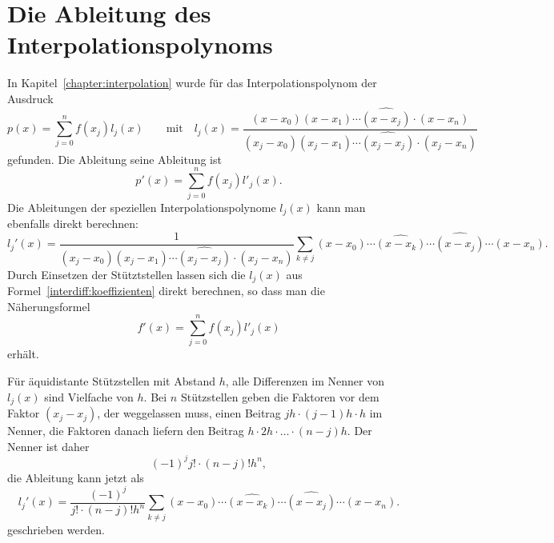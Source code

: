 \section{Die Ableitung des Interpolationspolynoms}
In Kapitel~\ref{chapter:interpolation} wurde für das Interpolationspolynom
der Ausdruck
\[
p(x)
=
\sum_{j=0}^n f(x_j) l_j(x)
\qquad\text{mit}\quad
l_j(x)
=
\frac{(x-x_0)(x-x_1)\cdots\widehat{(x-x_j)}\cdot (x-x_n)}{(x_j-x_0)(x_j-x_1)\cdots\widehat{(x_j-x_j)}\cdot (x_j-x_n)}
\]
gefunden.
Die Ableitung seine Ableitung ist
\[
p'(x)
=
\sum_{j=0}^n f(x_j) l'_j(x).
\]
Die Ableitungen der speziellen Interpolationspolynome $l_j(x)$ kann
man ebenfalls direkt berechnen:
\begin{equation}
l_j'(x)
=
\frac{1}{(x_j-x_0)(x_j-x_1)\cdots\widehat{(x_j-x_j)}\cdot (x_j-x_n)}
\sum_{k\ne j} (x-x_0)\cdots \widehat{(x-x_k)}\cdots\widehat{(x-x_j)}\cdots (x-x_n).
\label{interdiff:koeffizienten}
\end{equation}
Durch Einsetzen der Stütztstellen lassen sich die $l_j(x)$ aus
Formel~\eqref{interdiff:koeffizienten} direkt berechnen, so dass
man die Näherungsformel 
\begin{equation}
f'(x) = \sum_{j=0}^n f(x_j) l'_j(x)
\label{interdiff:ableitung}
\end{equation}
erhält.

Für äquidistante Stützstellen mit Abstand $h$, alle Differenzen im
Nenner von $l_j(x)$ sind Vielfache von $h$.
Bei $n$ Stützstellen geben die Faktoren vor dem Faktor $(x_j-x_j)$, der
weggelassen muss, einen Beitrag $jh\cdot (j-1)h \cdot h$ im Nenner,
die Faktoren danach liefern den Beitrag $h\cdot 2h\cdot \dots\cdot (n-j)h$.
Der Nenner ist daher
\[
(-1)^j
j!\cdot (n-j)! h^n,
\]
die Ableitung kann jetzt als
\begin{equation}
l_j'(x)
=
\frac{(-1)^j}{j!\cdot (n-j)! h^n}
\sum_{k\ne j} (x-x_0)\cdots \widehat{(x-x_k)}\cdots\widehat{(x-x_j)}\cdots (x-x_n).
\label{interdiff:koeffizienten2}
\end{equation}
geschrieben werden.

